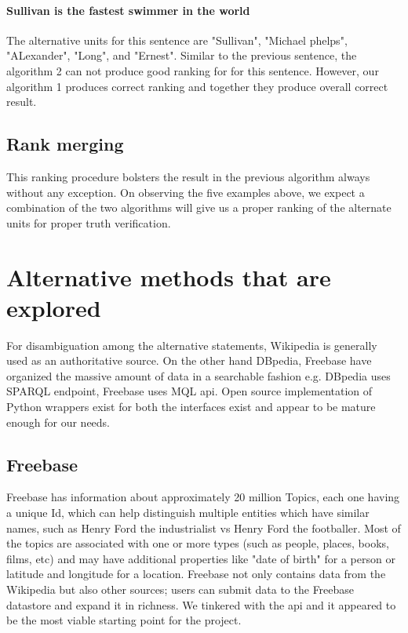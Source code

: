 \documentclass[11pt]{article}
\begin{document}
\paragraph{Sullivan is the fastest swimmer in the world}
The alternative units for this sentence are "Sullivan", "Michael phelps", "ALexander", "Long", and "Ernest". Similar to the previous sentence, the algorithm 2 can not produce good ranking for for this sentence. However, our algorithm 1 produces correct ranking and together they produce overall correct result.

\subsection{Rank merging}
This ranking procedure bolsters the result in the previous algorithm always without any exception. On observing the five examples above, we expect a combination of the two algorithms will give us a proper ranking of the alternate units for proper truth verification.



\section {Alternative methods that are explored}


%
%

For disambiguation among the alternative statements, Wikipedia is generally used
as an authoritative source. On the other hand DBpedia, Freebase have organized the
massive amount of data in a searchable fashion e.g. DBpedia uses SPARQL endpoint,
Freebase uses MQL api. Open source implementation of Python wrappers exist for
both the interfaces exist and appear to be mature enough for our needs.

\subsection{Freebase} 
Freebase has information about approximately 20 million Topics, each one having a
unique Id, which can help distinguish multiple entities which have similar names,
such as Henry Ford the industrialist vs Henry Ford the footballer. Most of the
topics are associated with one or more types\cite{freebasetype} (such as
people, places, books, films, etc) and may have additional properties like "date of birth" for a person
or latitude and longitude for a location. Freebase not only contains data from
the Wikipedia but also other sources; users can submit data to the Freebase
datastore and expand it in richness. We tinkered with the api\cite{freebaseapi}
and it appeared to be the most viable starting point for the project.
\end{document}
